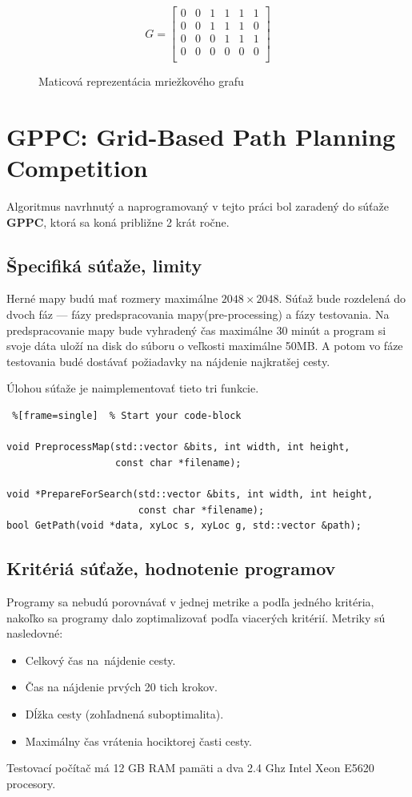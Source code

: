\begin{figure}[h]
\caption{Maticová reprezentácia mriežkového grafu}
\label{fig:maticova_reprezentacia}
\[
G =
  \begin{bmatrix}
    0 & 0 & 1 & 1 & 1 & 1\\
	0 & 0 & 1 & 1 & 1 & 0\\
	0 & 0 & 0 & 1 & 1 & 1\\
	0 & 0 & 0 & 0 & 0 & 0\\
  \end{bmatrix}
\]
\end{figure}




\section{GPPC: Grid-Based Path Planning Competition}
Algoritmus navrhnutý a naprogramovaný v tejto práci bol zaradený do súťaže \textbf{GPPC}, ktorá sa koná približne 2 krát ročne.

\subsection{Špecifiká súťaže, limity}

Herné mapy budú mať rozmery maximálne $2048 \times 2048$.
Súťaž bude rozdelená do dvoch fáz --- fázy predspracovania mapy(pre-processing)
a fázy testovania. Na predspracovanie mapy bude vyhradený čas
maximálne 30 minút a program si svoje dáta uloží na disk do súboru o veľkosti maximálne 50MB.
A potom vo fáze testovania budé dostávať požiadavky na nájdenie najkratšej cesty.

Úlohou súťaže je naimplementovať tieto tri funkcie.

\lstset{language=C++}          %

\begin{lstlisting} %[frame=single]  % Start your code-block

void PreprocessMap(std::vector &bits, int width, int height,
                   const char *filename);
                   
void *PrepareForSearch(std::vector &bits, int width, int height,
                       const char *filename);
bool GetPath(void *data, xyLoc s, xyLoc g, std::vector &path);
\end{lstlisting}

\subsection{Kritériá súťaže, hodnotenie programov}
Programy sa nebudú porovnávať v jednej metrike a podľa jedného
kritéria, nakoľko sa programy dalo zoptimalizovať podľa viacerých kritérií. Metriky sú nasledovné:

\begin{itemize}
\item Celkový čas na~nájdenie cesty.
\item Čas na nájdenie prvých 20 tich krokov.
\item Dĺžka cesty (zohľadnená suboptimalita).
\item Maximálny čas vrátenia hociktorej časti cesty.
\end{itemize}

Testovací počítač má 12 GB RAM pamäti a dva 2.4 Ghz Intel Xeon E5620
procesory.